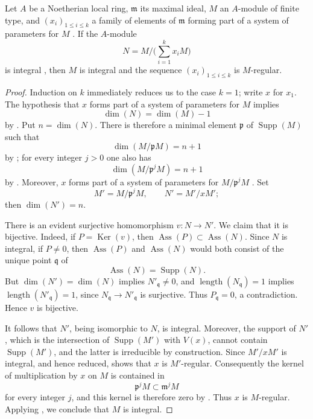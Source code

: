 \begin{corollary}[3.4.7]
\label{IV.3.4.7}
Let $A$ be a Noetherian local ring, $\mathfrak m$ its maximal ideal, $M$ an $A$-module of finite type, and $(x_i)_{1\leqslant i\leqslant k}$ a family of elements of $\mathfrak m$ forming part of a system of parameters for $M$ .
If the $A$-module
\[
N=M\Big/\Big(\sum_{i=1}^k x_iM\Big)
\]
is integral , then $M$ is integral and the sequence $(x_i)_{1\leqslant i\leqslant k}$ is $M$-regular.
\end{corollary}

\begin{proof}
Induction on $k$ immediately reduces us to the case $k=1$; write $x$ for $x_1$.
The hypothesis that $x$ forms part of a system of parameters for $M$ implies
\[
\dim(N)=\dim(M)-1
\]
by .
Put $n=\dim(N)$.
There is therefore a minimal element $\mathfrak p$ of $\operatorname{Supp}(M)$ such that
\[
\dim(M/\mathfrak pM)=n+1
\]
by ; for every integer $j>0$ one also has
\[
\dim(M/\mathfrak p^jM)=n+1
\]
by .
Moreover, $x$ forms part of a system of parameters for $M/\mathfrak p^jM$ .
Set
\[
M'=M/\mathfrak p^jM,
\qquad
N'=M'/xM';
\]
then $\dim(N')=n$.

There is an evident surjective homomorphism $v:N\to N'$.
We claim that it is bijective.
Indeed, if $P=\operatorname{Ker}(v)$, then $\operatorname{Ass}(P)\subset\operatorname{Ass}(N)$.
Since $N$ is integral, if $P\neq 0$, then $\operatorname{Ass}(P)$ and $\operatorname{Ass}(N)$ would both consist of the unique point $\mathfrak q$ of
\[
\operatorname{Ass}(N)=\operatorname{Supp}(N).
\]
But $\dim(N')=\dim(N)$ implies $N'_{\mathfrak q}\neq 0$, and $\operatorname{length}(N_{\mathfrak q})=1$ implies $\operatorname{length}(N'_{\mathfrak q})=1$, since $N_{\mathfrak q}\to N'_{\mathfrak q}$ is surjective.
Thus $P_{\mathfrak q}=0$, a contradiction.
Hence $v$ is bijective.

It follows that $N'$, being isomorphic to $N$, is integral.
Moreover, the support of $N'$, which is the intersection of $\operatorname{Supp}(M')$ with $V(x)$, cannot contain $\operatorname{Supp}(M')$, and the latter is irreducible by construction.
Since $M'/xM'$ is integral, and hence reduced,  shows that $x$ is $M'$-regular.
Consequently the kernel of multiplication by $x$ on $M$ is contained in
\[
\mathfrak p^jM\subset\mathfrak m^jM
\]
for every integer $j$, and this kernel is therefore zero by .
Thus $x$ is $M$-regular.
Applying , we conclude that $M$ is integral.
\end{proof}

